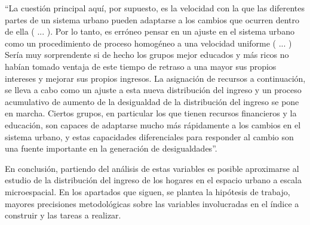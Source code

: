 “La cuestión principal aquí, por supuesto, es la velocidad con la que las diferentes partes de un sistema urbano pueden adaptarse a los cambios que ocurren dentro de ella ( ... ). Por lo tanto, es erróneo pensar en un ajuste en el sistema urbano como un procedimiento de proceso homogéneo a una velocidad uniforme ( ... ) Sería muy sorprendente si de hecho los grupos mejor educados y más ricos no habían tomado ventaja de este tiempo de retraso a una mayor sus propios intereses y mejorar sus propios ingresos. La asignación de recursos a continuación, se lleva a cabo como un ajuste a esta nueva distribución del ingreso y un proceso acumulativo de aumento de la desigualdad de la distribución del ingreso se pone en marcha. Ciertos grupos, en particular los que tienen recursos financieros y la educación, son capaces de adaptarse mucho más rápidamente a los cambios en el sistema urbano, y estas capacidades diferenciales para responder al cambio son una fuente importante en la generación de desigualdades”\cite[~56]{harvey}.
	
En conclusión, partiendo del análisis de estas variables es posible aproximarse al estudio de la distribución del ingreso de los hogares en el espacio urbano a escala microespacial. En los apartados que siguen, se plantea la hipótesis de trabajo, mayores precisiones metodológicas sobre las variables involucradas en el índice a construir y las tareas a realizar.
	
	
	
